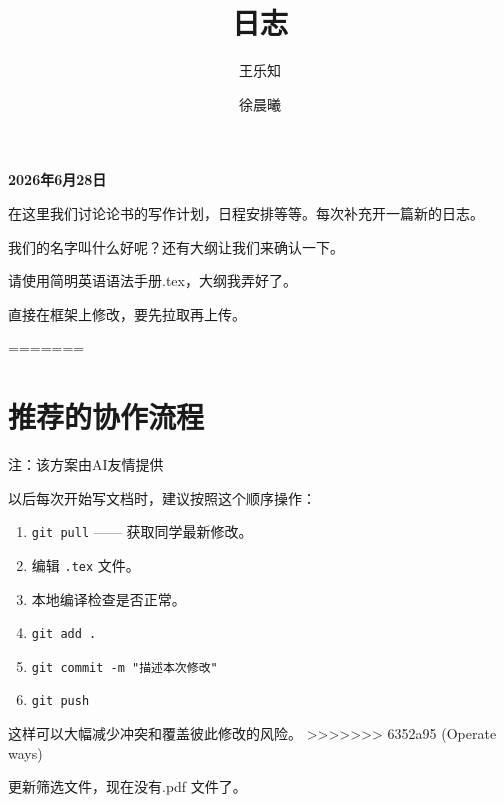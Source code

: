 \documentclass[UTF8]{ctexart}
\title{日志}
\author{王乐知 \and 徐晨曦}
\begin{document}
\maketitle

\noindent\textbf{2026年6月28日}

\vspace{1em}

在这里我们讨论论书的写作计划，日程安排等等。每次补充开一篇新的日志。

我们的名字叫什么好呢？还有大纲让我们来确认一下。

请使用简明英语语法手册.tex，大纲我弄好了。

直接在框架上修改，要先拉取再上传。

=======
\section*{推荐的协作流程}

注：该方案由AI友情提供

以后每次开始写文档时，建议按照这个顺序操作：

\begin{enumerate}
    \item \texttt{git pull} —— 获取同学最新修改。
    \item 编辑 \texttt{.tex} 文件。
    \item 本地编译检查是否正常。
    \item \texttt{git add .}
    \item \texttt{git commit -m "描述本次修改"}
    \item \texttt{git push}
\end{enumerate}

这样可以大幅减少冲突和覆盖彼此修改的风险。
>>>>>>> 6352a95 (Operate ways)

更新筛选文件，现在没有.pdf 文件了。
\end{document}
